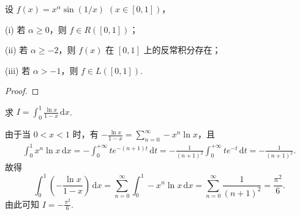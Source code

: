 \documentclass[../../main.tex]{subfiles}%
\begin{document}
\begin{example}
设 \( f(x) = x^{\alpha} \sin(1/x) \) \( (x \in [0, 1]) \)，

(i) 若 \( \alpha \geqslant  0 \)，则 \( f \in R([0, 1]) \)；

(ii) 若 \( \alpha \geqslant  -2 \)，则 \( f(x) \) 在 \( [0, 1] \) 上的反常积分存在；

(iii) 若 \( \alpha > -1 \)，则 \( f \in L([0, 1]) \).
\end{example}
\begin{proof}



\end{proof}

\begin{example}
求 \( I = \int_0^1 \frac{\ln x}{1 - x} \, \mathrm{d}x \).
\end{example}
\begin{solution}

由于当 \( 0 < x < 1 \) 时，有 \( -\frac{\ln x}{1 - x} = \sum_{n = 0}^{\infty} -x^n \ln x \)，且
\begin{align*}
\int_0^1 x^n \ln x \, \mathrm{d}x = -\int_0^{+\infty} t e^{-(n + 1)t} \, \mathrm{d}t = -\frac{1}{(n + 1)^2} \int_0^{+\infty} t e^{-t} \, \mathrm{d}t = -\frac{1}{(n + 1)^2}.
\end{align*}
故得
\[
\int_0^1 \left( -\frac{\ln x}{1 - x} \right) \, \mathrm{d}x = \sum_{n = 0}^{\infty} \int_0^1 -x^n \ln x \, \mathrm{d}x = \sum_{n = 0}^{\infty} \frac{1}{(n + 1)^2} = \frac{\pi^2}{6}.
\]
由此可知 \( I = -\frac{\pi^2}{6} \).

\end{solution}
\end{document}
